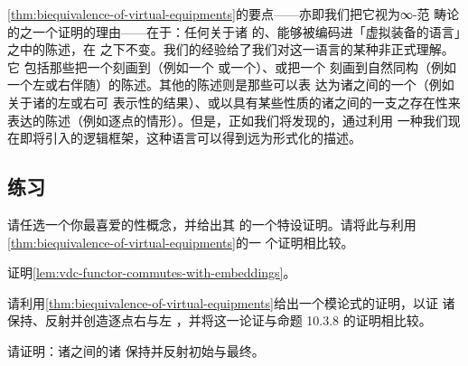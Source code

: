 \cref{thm:biequivalence-of-virtual-equipments}的要点——亦即我们把它视为∞-范
畴论的\trModelIndependence{}之一个证明的理由——在于：任何关于诸%
\trInfinityCategory{}的、能够被编码进「虚拟装备的语言」之中的陈述，在%
\trChangeOfModel{}之下不变。我们的经验给了我们对这一语言的某种非正式理解。它
包括那些把一个\trInfinityCategory{}刻画到\trEquivalence{}（例如一个%
\trCommaInfinityCategory{}或一个\trArrowInfinityCategory）、或把一个\trFunctor{}%
刻画到自然同构（例如一个左或右伴随）的陈述。其他的\trModelIndependent{}陈述则是那些可以表
达为诸\trModule{}之间的一个\trEquivalence{}（例如关于诸\trModule{}的左或右可
表示性的结果）、或以具有某些性质的诸\trModule{}之间的一支\trCell{}之存在性来
表达的陈述（例如逐点\trExtension{}的情形）。但是，正如我们将发现的，通过利用
一种我们现在即将引入的逻辑框架，这种\trModelIndependent{}语言可以得到远为形式化的描述。

\subsection*{练习}

\begin{exercise}\label{ex:adhoc-model-independence}
请任选一个你最喜爱的\trInfinityCategory{}性概念，并给出其\trModelIndependence{}%
的一个特设证明。请将此与利用\cref{thm:biequivalence-of-virtual-equipments}的一
个证明相比较。
\end{exercise}

\begin{exercise}\label{ex:prove-embeddings-commute}
证明\cref{lem:vdc-functor-commutes-with-embeddings}。
\end{exercise}

\begin{exercise}\label{ex:pointwise-extensions-via-modules}
请利用\cref{thm:biequivalence-of-virtual-equipments}给出一个模论式的证明，以证
诸\trCosmologicalBiequivalence{}保持、反射并创造逐点右\trExtension{}与左%
\trExtension，并将这一论证与命题 10.3.8 的证明相比较。
\end{exercise}

\begin{exercise}\label{ex:initial-final-functors}
请证明：诸\trCartesianClosed{}\trInfinityCosmos{}之间的诸%
\trCosmologicalBiequivalence{}保持并反射初始\trFunctor{}与最终\trFunctor。
\end{exercise}

